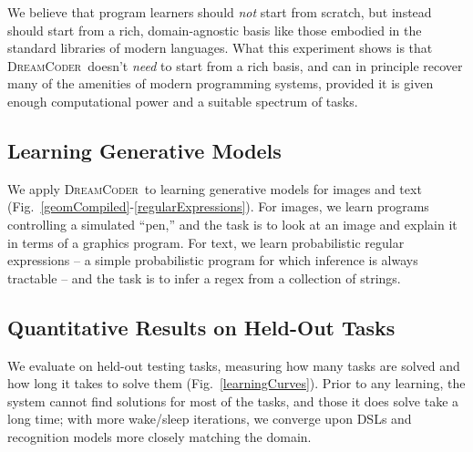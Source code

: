 \documentclass{article}
\newcommand{\system}{\textsc{DreamCoder}~}
\newcommand{\systemEnding}{\textsc{DreamCoder}}
\begin{document}
We believe that program learners should \emph{not}
start from scratch,
but instead should start from
a rich, domain-agnostic
basis like those embodied in the standard libraries of modern  languages.
What this experiment shows is that \system doesn't \emph{need} to start from a rich basis,
and can in principle recover many of the amenities of modern programming systems,
provided it is given enough computational power and a suitable
spectrum of tasks.%

\subsection{Learning Generative Models}

We apply \system to learning generative models for images and text (Fig.~\ref{geomCompiled}-\ref{regularExpressions}).
For images, we learn programs controlling a simulated ``pen,''
and the task is to look at an image and explain it in terms of a graphics program.
For text, we learn probabilistic regular expressions -- a simple probabilistic program for which inference is always tractable -- and the task is to
infer a regex from a collection of strings.



\subsection{Quantitative Results on Held-Out Tasks}\label{quantitative}
We evaluate  on held-out testing tasks,
measuring how many
tasks are solved and how long it takes to solve them (Fig.~\ref{learningCurves}).
Prior to any learning,
the system cannot find solutions for most of the tasks,
and those it does solve take a long time;
with more wake/sleep iterations,
we converge upon DSLs and recognition models 
more closely matching the domain.

\end{document}
